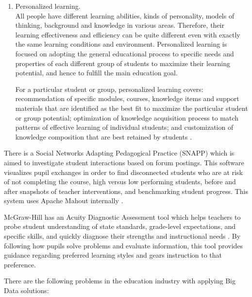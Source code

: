 \documentclass[runningheads]{llncs}
\begin{document}
\begin{enumerate}
\item Personalized learning.\\

All people have different learning abilities, kinds of personality, models of thinking, background and knowledge in various areas. Therefore, their learning effectiveness and efficiency can be quite different even with exactly the same learning conditions and environment. Personalized learning is focused on adopting the general educational process to specific needs and properties of each different group of students to maximize their learning potential, and hence to fulfill the main education goal. 

For a particular student or group, personalized learning covers: recommendation of specific modules, courses, knowledge items and support materials that are identified as the best fit to maximize the particular student or group potential; optimization of knowledge acquisition process to match patterns of effective learning of individual
students; and customization of knowledge composition that are best retained by students \cite{EDUCATIONOPPORTUNITIES}.

\end{enumerate}

There is a Social Networks Adapting Pedagogical Practice (SNAPP) which is aimed to investigate student interactions based on forum postings. This software visualizes pupil exchanges in order to find disconnected students who are at risk of not completing the course, high versus low performing students, before and after snapshots of teacher interventions, and benchmarking student progress. This system uses Apache Mahout internally \cite{EDREPORT}. 

McGraw-Hill has an Acuity Diagnostic Assessment tool which helps teachers to probe student understanding of state standards, grade-level expectations, and specific skills, and quickly diagnose their strengths and instructional needs \cite{MCGRAW}. By following how pupils solve problems and evaluate information, this tool provides guidance regarding preferred learning styles and gears instruction to that preference. 

There are the following problems in the education industry with applying Big Data solutions:
\end{document}
